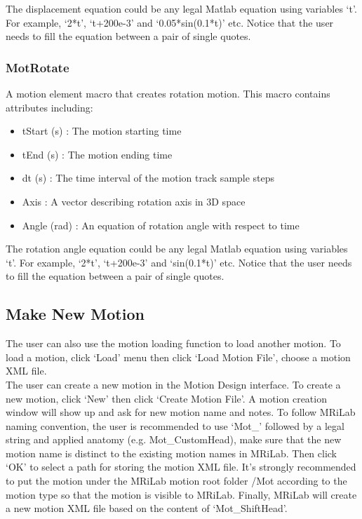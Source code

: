 \documentclass{book}%
\begin{document}
The displacement equation could be any legal Matlab equation using variables `t'. For example, `2*t', `t+200e-3' and `0.05*sin(0.1*t)' etc. Notice that the user needs to fill the equation between a pair of single quotes.


\subsubsection{MotRotate}

A motion element macro that creates rotation motion. This macro contains attributes including:

\begin{itemize}
	\item tStart (s) : The motion starting time
  \item tEnd (s) : The motion ending time
	\item dt (s) : The time interval of the motion track sample steps
	\item Axis : A vector describing rotation axis in 3D space
	\item Angle (rad) : An equation of rotation angle with respect to time
\end{itemize}

The rotation angle equation could be any legal Matlab equation using variables `t'. For example, `2*t', `t+200e-3' and `sin(0.1*t)' etc. Notice that the user needs to fill the equation between a pair of single quotes.


\subsection{Make New Motion}

The user can also use the motion loading function to load another motion. To load a motion, click `Load' menu then click `Load Motion File', choose a motion XML file.\\

The user can create a new motion in the Motion Design interface. To create a new motion, click `New' then click `Create Motion File'. A motion creation window will show up and ask for new motion name and notes. To follow MRiLab naming convention, the user is recommended to use `Mot\_' followed by a legal string and applied anatomy (e.g. Mot\_CustomHead), make sure that the new motion name is distinct to the existing motion names in MRiLab. Then click `OK' to select a path for storing the motion XML file. It's strongly recommended to put the motion under the MRiLab motion root folder /Mot according to the motion type so that the motion is visible to MRiLab. Finally, MRiLab will create a new motion XML file based on the content of `Mot\_ShiftHead'. \\
\end{document}

